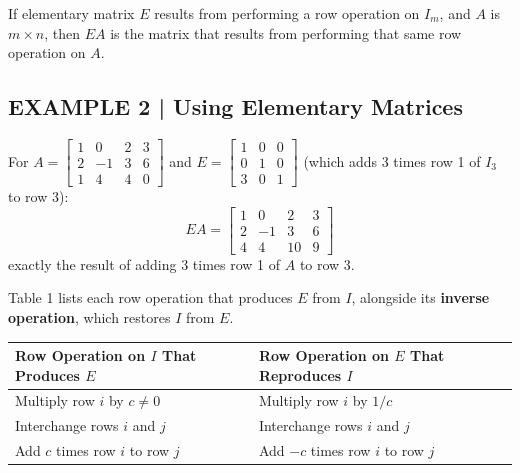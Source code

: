 \documentclass{article}
\theoremstyle{mystyle}
\begin{document}
\begin{tcolorbox}[colback=red!4, colframe=red!60!black, title=Theorem 1.5.1 -- Row Operations by Matrix Multiplication, boxrule=0.5mm, arc=3mm]
If elementary matrix $E$ results from performing a row operation on $I_m$, and $A$ is $m\times n$, then $EA$ is the matrix that results from performing that same row operation on $A$.
\end{tcolorbox}

\subsection*{EXAMPLE 2 | Using Elementary Matrices}
For $A=\begin{bmatrix}1&0&2&3\\2&-1&3&6\\1&4&4&0\end{bmatrix}$ and $E=\begin{bmatrix}1&0&0\\0&1&0\\3&0&1\end{bmatrix}$ (which adds 3 times row 1 of $I_3$ to row 3):
\[
EA=\begin{bmatrix}1&0&2&3\\2&-1&3&6\\4&4&10&9\end{bmatrix}
\]
exactly the result of adding 3 times row 1 of $A$ to row 3.

Table 1 lists each row operation that produces $E$ from $I$, alongside its \textbf{inverse operation}, which restores $I$ from $E$.

\begin{center}
\begin{tabular}{|l|l|}
\hline
\textbf{Row Operation on $I$ That Produces $E$} & \textbf{Row Operation on $E$ That Reproduces $I$}\\
\hline
Multiply row $i$ by $c\ne0$ & Multiply row $i$ by $1/c$\\
\hline
Interchange rows $i$ and $j$ & Interchange rows $i$ and $j$\\
\hline
Add $c$ times row $i$ to row $j$ & Add $-c$ times row $i$ to row $j$\\
\hline
\end{tabular}
\end{center}
\end{document}
